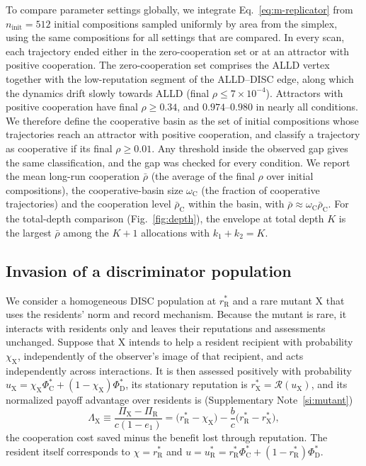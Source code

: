 \documentclass[fleqn,10pt]{wlscirep}
\newcommand{\Rmap}{\mathscr{R}}            %
\newcommand{\rR}{r_{\mathrm{R}}^{*}}
\newcommand{\uR}{u_{\mathrm{R}}^{*}}
\newcommand{\rX}{r_{\mathrm{X}}^{*}}
\newcommand{\uX}{u_{\mathrm{X}}}
\theoremstyle{plain}
\begin{document}
To compare parameter settings globally, we integrate Eq.~\eqref{eq:m-replicator} from $n_{\mathrm{init}}=512$ initial compositions sampled uniformly by area from the simplex, using the same compositions for all settings that are compared. In every scan, each trajectory ended either in the zero-cooperation set or at an attractor with positive cooperation. The zero-cooperation set comprises the ALLD vertex together with the low-reputation segment of the ALLD--DISC edge, along which the dynamics drift slowly towards ALLD (final $\rho\leq7\times10^{-4}$). Attractors with positive cooperation have final $\rho\geq0.34$, and $0.974$--$0.980$ in nearly all conditions. We therefore define the cooperative basin as the set of initial compositions whose trajectories reach an attractor with positive cooperation, and classify a trajectory as cooperative if its final $\rho\geq0.01$. Any threshold inside the observed gap gives the same classification, and the gap was checked for every condition. We report the mean long-run cooperation $\bar\rho$ (the average of the final $\rho$ over initial compositions), the cooperative-basin size $\omega_{\mathrm C}$ (the fraction of cooperative trajectories) and the cooperation level $\bar\rho_{\mathrm C}$ within the basin, with $\bar\rho\approx\omega_{\mathrm C}\bar\rho_{\mathrm C}$. For the total-depth comparison (Fig.~\ref{fig:depth}), the envelope at total depth $K$ is the largest $\bar\rho$ among the $K+1$ allocations with $k_1+k_2=K$.

\subsection*{Invasion of a discriminator population}

We consider a homogeneous DISC population at $\rR$ and a rare mutant X that uses the residents' norm and record mechanism. Because the mutant is rare, it interacts with residents only and leaves their reputations and assessments unchanged. Suppose that X intends to help a resident recipient with probability $\chi_{\mathrm X}$, independently of the observer's image of that recipient, and acts independently across interactions. It is then assessed positively with probability $\uX=\chi_{\mathrm X}\Phi^*_{\mathrm C}+(1-\chi_{\mathrm X})\Phi^*_{\mathrm D}$, its stationary reputation is $\rX=\Rmap(\uX)$, and its normalized payoff advantage over residents is (Supplementary Note~\ref{si:mutant})
\begin{equation}
\Lambda_{\mathrm X}\equiv\frac{\Pi_{\mathrm X}-\Pi_{\mathrm R}}{c(1-e_1)}
=\bigl(\rR-\chi_{\mathrm X}\bigr)-\frac{b}{c}\bigl(\rR-\rX\bigr),
\label{eq:m-mutant}
\end{equation}
the cooperation cost saved minus the benefit lost through reputation. The resident itself corresponds to $\chi=\rR$ and $u=\uR=\rR\Phi^*_{\mathrm C}+(1-\rR)\Phi^*_{\mathrm D}$.
\end{document}
